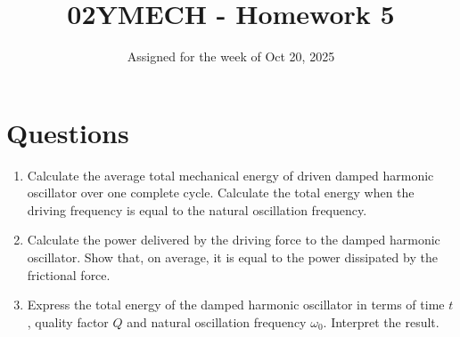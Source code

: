 \documentclass[12pt]{article}
\title{02YMECH - Homework 5}
\date{Assigned for the week of Oct 20, 2025}
\author{}
\begin{document}
\maketitle

\section*{Questions}

\begin{enumerate}
    \item Calculate the average total mechanical energy of driven damped harmonic oscillator over one complete cycle. Calculate the total energy when the driving frequency is equal to the natural oscillation frequency.
    \item Calculate the power delivered by the driving force to the damped harmonic oscillator. Show that, on average, it is equal to the power dissipated by the frictional force.
    \item Express the total energy of the damped harmonic oscillator in terms of time \( t \), quality factor \( Q \) and natural oscillation frequency \( \omega_0 \). Interpret the result.

\end{enumerate}
\end{document}
